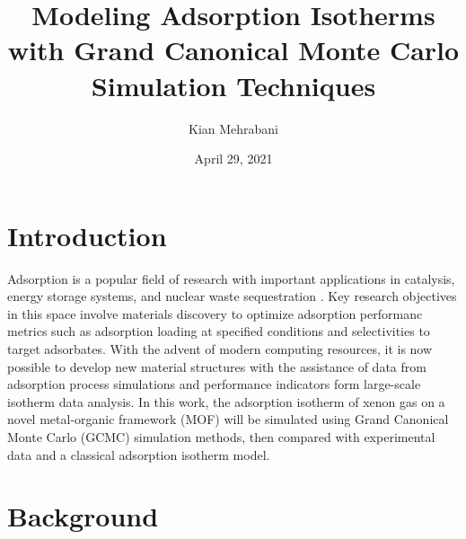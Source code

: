 \documentclass{article}
\author{Kian Mehrabani}
\date{April 29, 2021}
\title{Modeling Adsorption Isotherms with Grand Canonical Monte Carlo Simulation Techniques}
\begin{document}
\maketitle\newpage
\doublespacing

\section{Introduction}
Adsorption is a popular field of research with important applications in catalysis, energy storage systems, and nuclear waste sequestration \cite{h2-storage,sbmof-discovery}.
Key research objectives in this space involve materials discovery to optimize adsorption performanc metrics such as adsorption loading at specified conditions and selectivities to target adsorbates.
With the advent of modern computing resources, it is now possible to develop new material structures with the assistance of data from adsorption process simulations and performance indicators form large-scale isotherm data analysis.
In this work, the adsorption isotherm of xenon gas on a novel metal-organic framework (MOF) will be simulated using Grand Canonical Monte Carlo (GCMC) simulation methods,
then compared with experimental data and a classical adsorption isotherm model.

\section{Background}
\end{document}
